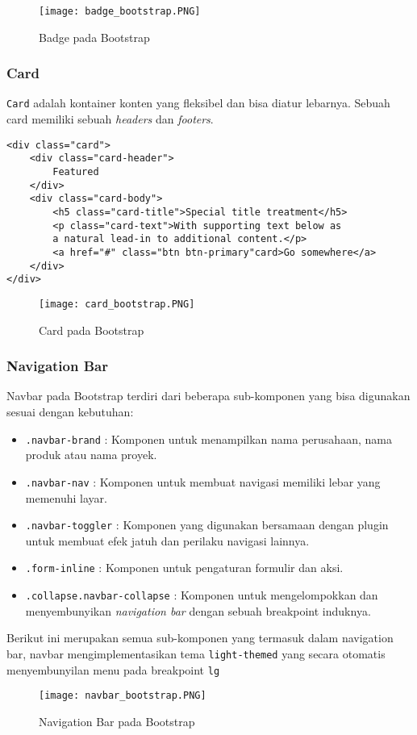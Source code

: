 {\begin{figure} [H]
	\centering  
	\texttt{[image: badge\_bootstrap.PNG]}  
	\caption{Badge pada Bootstrap} 
\end{figure}

\subsubsection{Card}
\texttt{Card} adalah kontainer konten yang fleksibel dan bisa diatur lebarnya. Sebuah card memiliki sebuah \textit{headers} dan \textit{footers}.

\begin{lstlisting}[frame=single, basicstyle=\tiny]
<div class="card">
	<div class="card-header">
		Featured
	</div>
	<div class="card-body">
		<h5 class="card-title">Special title treatment</h5>
		<p class="card-text">With supporting text below as 
		a natural lead-in to additional content.</p>
		<a href="#" class="btn btn-primary"card>Go somewhere</a>
	</div>
</div>
\end{lstlisting}

\begin{figure} [H]
	\centering  
	\texttt{[image: card\_bootstrap.PNG]}  
	\caption{Card pada Bootstrap} 
\end{figure}

\subsubsection{Navigation Bar}
Navbar pada Bootstrap terdiri dari beberapa sub-komponen yang bisa digunakan sesuai dengan kebutuhan:
\begin{itemize}
    \item \texttt{.navbar-brand} : Komponen untuk menampilkan nama perusahaan, nama produk atau nama proyek.
    \item \texttt{.navbar-nav} : Komponen untuk membuat navigasi memiliki lebar yang memenuhi layar.
    \item \texttt{.navbar-toggler} : Komponen yang digunakan bersamaan dengan plugin untuk membuat efek jatuh dan perilaku navigasi lainnya.
    \item \texttt{.form-inline} : Komponen untuk pengaturan formulir dan aksi.
    \item \texttt{.collapse.navbar-collapse} : Komponen untuk mengelompokkan dan menyembunyikan \textit{navigation bar} dengan sebuah breakpoint induknya.
\end{itemize}
Berikut ini merupakan semua sub-komponen yang termasuk dalam navigation bar, navbar mengimplementasikan tema \texttt{light-themed} yang secara otomatis menyembunyilan menu pada breakpoint \texttt{lg}
\begin{figure} [H]
	\centering  
	\texttt{[image: navbar\_bootstrap.PNG]}  
	\caption{Navigation Bar pada Bootstrap} 
\end{figure}

}
